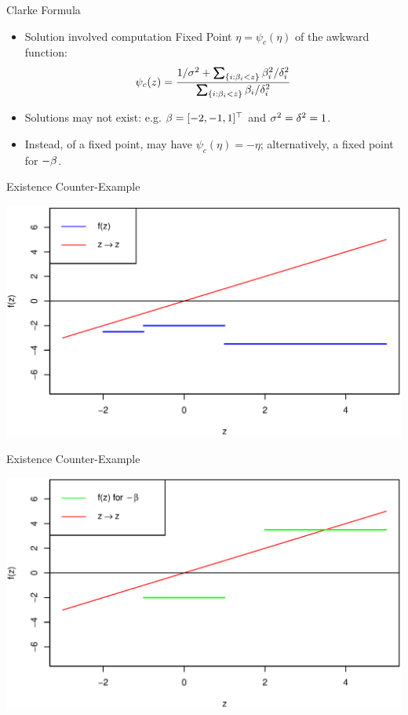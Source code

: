 \documentclass[11pt,leqno]{beamer}
\begin{document}
\begin{frame}{Clarke Formula}
\begin{itemize}
\item Solution involved computation Fixed Point $\eta = \psi_c(\eta)$ of the awkward function:
\begin{equation}
 \psi_{c}(z) = \frac{1/\gs^2 + \sum_{\{i: \gb_i<z\}} \gb_i^2/\gd_i^2 }{ \sum_{\{i: \gb_i<z\}} \gb_i/\gd_i^2 }
\end{equation}

\item Solutions may not exist: e.g. $\beta = [-2,-1,1]^\top$ and $\sigma^2 = \delta^2 = 1$.
\item Instead, of a fixed point, may have $\psi_c(\eta) = -\eta$; alternatively, a fixed point for $-\beta$.
\end{itemize}
\end{frame}
\begin{frame}{Existence Counter-Example}
\begin{centering}
\includegraphics[scale=.5]{Clarke_Plot.eps}
\end{centering}
\end{frame}
\begin{frame}{Existence Counter-Example}
\begin{centering}
\includegraphics[scale=.5]{Clarke_Plot2.eps}
\end{centering}
\end{frame}
\end{document}
